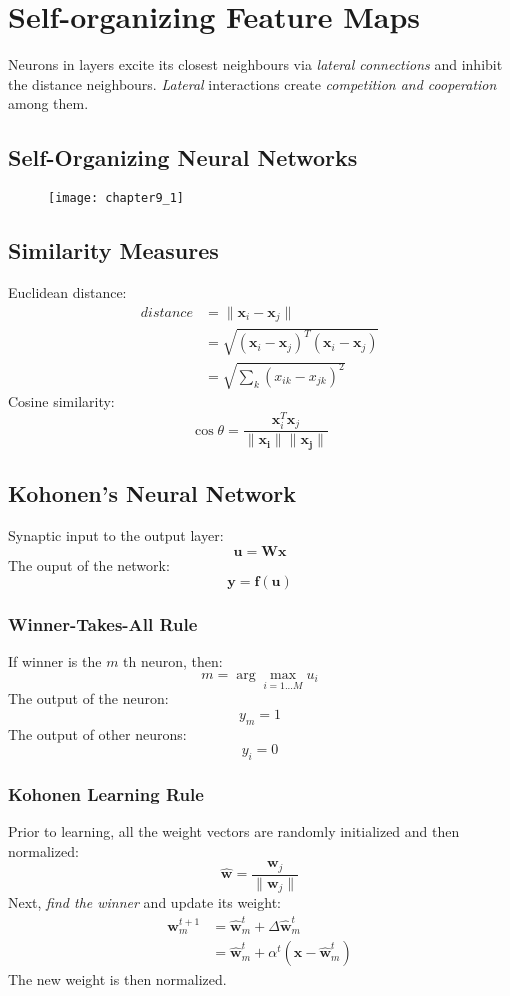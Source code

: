 \chapter{Self-organizing Feature Maps}
Neurons in layers excite its closest neighbours via \emph{lateral connections} and inhibit the distance neighbours. \emph{Lateral} interactions create \emph{competition and cooperation} among them. 

\section{Self-Organizing Neural Networks}
\begin{figure}[!h]
\centering
\texttt{[image: chapter9\_1]}
\end{figure}

\section{Similarity Measures}
Euclidean distance:
\begin{equation*}
\begin{split}
distance &= \|\boldsymbol{x}_i - \boldsymbol{x}_j \| \\
&= \sqrt{(\boldsymbol{x}_i - \boldsymbol{x}_j)^{T} (\boldsymbol{x}_i - \boldsymbol{x}_j)} \\
&= \sqrt{\sum_k (x_{ik} - x_{jk})^{2}}
\end{split}
\end{equation*}
Cosine similarity:
$$\cos \theta = \frac{\boldsymbol{x}_i^{T} \boldsymbol{x}_j}{\|\boldsymbol{x_i}\|\|\boldsymbol{x_j}\|}$$

\section{Kohonen's Neural Network}
Synaptic input to the output layer:
$$\mathbf{u = Wx}$$
The ouput of the network:
$$\mathbf{y = f(u)}$$

\subsection{Winner-Takes-All Rule}
If winner is the $m$ th neuron, then:
$$m = \arg\!\max_{i=1...M} u_i$$
The output of the neuron:
$$y_m = 1$$
The output of other neurons:
$$y_i = 0$$

\subsection{Kohonen Learning Rule}
Prior to learning, all the weight vectors are randomly initialized and then normalized:
$$\mathbf{\hat{w}} = \frac{\mathbf{w}_j}{\|\mathbf{w}_j\|}$$
Next, \emph{find the winner} and update its weight:
\begin{equation*}
\begin{split}
\mathbf{w}_m^{t+1} &= \mathbf{\hat{w}}_m^{t} + \Delta \mathbf{\hat{w}}_m^{t} \\
&= \mathbf{\hat{w}}_m^{t} + \alpha^{t}(\mathbf{x} - \mathbf{\hat{w}}_m^{t})
\end{split}
\end{equation*}
The new weight is then normalized.

